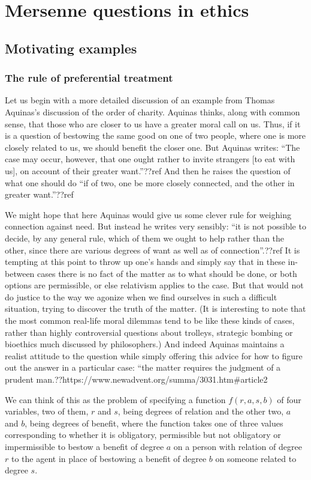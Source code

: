 
\def\mychapter{II}

\chapter{Mersenne questions in ethics}\label{ch:ethics}
\section{Motivating examples}
\subsection{The rule of preferential treatment}
Let us begin with a more detailed discussion of an example from Thomas Aquinas's discussion of the order of charity. Aquinas thinks,
along with common sense, that those who are closer to us have a greater moral call on us.
Thus, if it is a question of bestowing the same good on one of two people, where one is more closely
related to us, we should benefit the closer one. But Aquinas writes: ``The case may occur, however, that one 
ought rather to invite strangers [to eat with us], on 
account of their greater want.''??ref And then he raises the question of what one should do ``if of two, one be 
more closely connected, and the other in greater want.''??ref

We might hope that here Aquinas would give us some clever rule for weighing connection against need. But 
instead he writes very sensibly: ``it is not possible to decide, by any general rule, which of them we ought 
to help rather than the other, since there are various degrees of want as well as of connection''.??ref It is
tempting at this point to throw up one's hands and simply say that in these in-between cases there is no
fact of the matter as to what should be done, or both options are permissible, or else relativism applies
to the case. But that would not do justice to the way we agonize when we find ourselves in such a difficult 
situation, trying to discover the truth of the matter. (It is interesting to note that the most common real-life moral dilemmas
tend to be like these kinds of cases, rather than highly controversial questions about trolleys, strategic bombing or
bioethics much discussed by philosophers.)
And indeed Aquinas maintains a realist attitude to
the question while simply offering this advice for how to figure out the answer in a particular case: ``the matter 
requires the judgment of a prudent man.??https://www.newadvent.org/summa/3031.htm\#article2

We can think of this as the problem of specifying a function $f(r,a,s,b)$ of four variables, two of them, $r$ and $s$, being
degrees of relation and the other two, $a$ and $b$, being degrees of benefit, where the function takes one of three values
corresponding to whether it is obligatory, permissible but not obligatory or impermissible to bestow a benefit of degree $a$ on a person with
relation of degree $r$ to the agent in place of bestowing a benefit of degree $b$ on someone related to degree $s$. 

